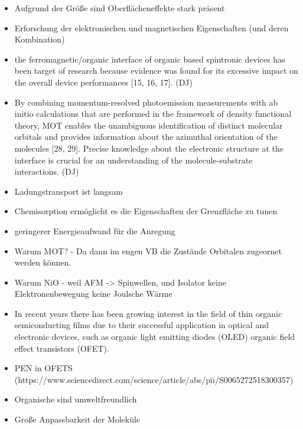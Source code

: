 \begin{itemize}
    \item Aufgrund der Größe sind Oberflächeneffekte stark präsent
    \item Erforschung der elektronischen und magnetischen Eigenschaften (und deren Kombination)
    \item the ferromagnetic/organic interface of organic based spintronic devices has been target of research because evidence was found for its excessive impact on the overall device performances [15, 16, 17]. (DJ)
    \item By combining momentum-resolved photoemission measurements with ab initio calculations that are performed in the framework of density functional theory, MOT enables the unambiguous identification of distinct molecular orbitals and provides information about the azimuthal orientation of the molecules [28, 29]. Precise knowledge about the electronic structure at the interface is crucial for an understanding of the molecule-substrate interactions. (DJ)
    \item Ladungstransport ist langsam
    \item Chemisorption ermöglicht es die Eigenschaften der Grenzfläche zu tunen
    \item geringerer Energieaufwand für die Anregung
    \item Warum MOT? - Da dann im engen VB die Zustände Orbitalen zugeornet werden können.
    \item Warum NiO - weil AFM -> Spinwellen, und Isolator keine Elektronenbewegung keine Joulsche Wärme
    \item In recent years there has been growing interest in the field of thin organic semiconducting films due to their successful application in optical and electronic devices, such as organic light emitting diodes (OLED) organic field effect transistors (OFET). \cite{Uni-Tübingen}
    \item PEN in OFETS (https://www.sciencedirect.com/science/article/abs/pii/S0065272518300357)
    \item Organische sind umweltfreundlich \cite{Schöll und Schreiber - 2018 - Chapter 24 - Thin Films of Organic Molecules Inte.pdf}
    \item Große Anpassbarkeit der Moleküle \cite{Schöll und Schreiber - 2018 - Chapter 24 - Thin Films of Organic Molecules Inte.pdf}
\end{itemize}
